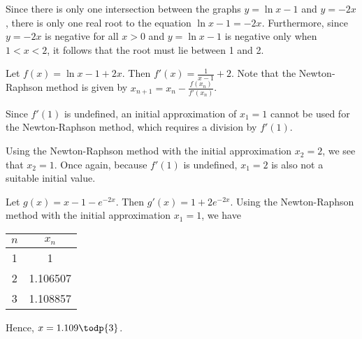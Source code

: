 \begin{solution}
\begin{ppart}
\begin{center}
        \end{center}

        Since there is only one intersection between the graphs $y = \ln{x-1}$ and $y = -2x$, there is only one real root to the equation $\ln{x-1} = -2x$. Furthermore, since $y=-2x$ is negative for all $x > 0$ and $y = \ln{x-1}$ is negative only when $1 < x < 2$, it follows that the root must lie between 1 and 2.

        Let $f(x) = \ln{x-1} + 2x$. Then $f'(x) = \frac1{x-1} + 2$. Note that the Newton-Raphson method is given by $x_{n+1} = x_n - \frac{f(x_n)}{f'(x_n)}$.

        Since $f'(1)$ is undefined, an initial approximation of $x_1 = 1$ cannot be used for the Newton-Raphson method, which requires a division by $f'(1)$.

        Using the Newton-Raphson method with the initial approximation $x_2 = 2$, we see that $x_2 = 1$. Once again, because $f'(1)$ is undefined, $x_1 = 2$ is also not a suitable initial value.

        Let $g(x) = x-1-e^{-2x}$. Then $g'(x) = 1+2e^{-2x}$. Using the Newton-Raphson method with the initial approximation $x_1=1$, we have
        \begin{table}[H]
            \centering
            \begin{tabular}{|c|c|}
            \hline
            $n$ & $x_n$ \\ \hline
            1 & 1 \\ \hline
            2 & 1.106507 \\ \hline
            3 & 1.108857 \\ \hline
            \end{tabular}
        \end{table}
        Hence, $x = 1.109 \todp{3}$.
    \end{ppart}
\end{solution}

